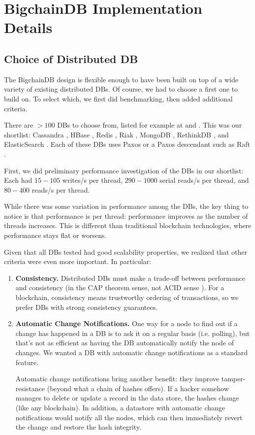 \section{BigchainDB Implementation Details}\label{sec:implementation}

\subsection{Choice of Distributed DB}
The BigchainDB design is flexible enough to have been built on top of a wide variety of existing distributed DBs.
Of course, we had to choose a first one to build on.
To select which, we first did benchmarking, then added additional criteria.

There are $>100$ DBs to choose from, listed for example at \cite{nosql} and \cite{toad2015toad}.
This was our shortlist: Cassandra \cite{cassandra}, HBase \cite{hbase}, Redis \cite{redis}, Riak \cite{riak}, MongoDB \cite{mongodb}, RethinkDB \cite{rethinkdb}, and ElasticSearch \cite{elasticsearch}.
Each of these DBs uses Paxos or a Paxos descendant such as Raft \cite{ongaro2014raft}.

First, we did preliminary performance investigation of the DBs in our shortlist: Each had $15-105$ writes/s per thread, $290-1000$ serial reads/s per thread, and $80-400$ reads/s per thread.

While there was some variation in performance among the DBs, the key thing to notice is that performance is per thread: performance improves as the number of threads increases.
This is different than traditional blockchain technologies, where performance stays flat or worsens.

Given that all DBs tested had good scalability properties, we realized that other criteria were even more important. In particular:
\begin{enumerate}
 \item \textbf{Consistency.} Distributed DBs must make a trade-off between performance and consistency (in the CAP theorem \cite{wiki_cap} sense, not ACID sense \cite{wiki_acid}). For a blockchain, consistency means trustworthy ordering of transactions, so we prefer DBs with strong consistency guarantees.
 \item{\textbf{Automatic Change Notifications.} One way for a node to find out if a change has happened in a DB is to ask it on a regular basis (i.e. polling), but that’s not as efficient as having the DB automatically notify the node of changes.
  We wanted a DB with automatic change notifications as a standard feature.
  
  \medskip
  Automatic change notifications bring another benefit: they improve tamper-resistance (beyond what a chain of hashes offers).
  If a hacker somehow manages to delete or update a record in the data store, the hashes change (like any blockchain).
  In addition, a datastore with automatic change notifications would notify all the nodes, which can then immediately revert the change and restore the hash integrity.}
\end{enumerate}

